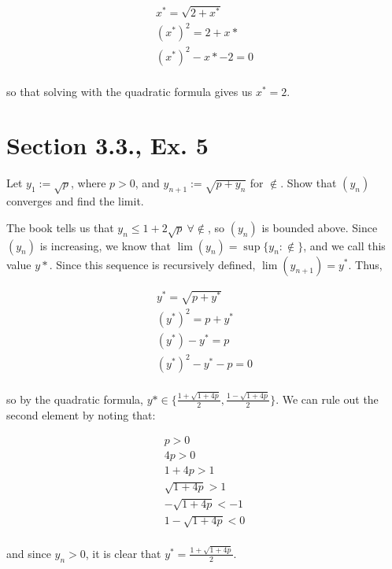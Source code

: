 \documentclass[paper=a4, fontsize=11pt]{scrartcl} %
\numberwithin{equation}{section} %
\numberwithin{figure}{section} %
\numberwithin{table}{section} %
\begin{document}
\begin{gather*}
x^* = \sqrt{2 + x^*}\\
(x^*)^2 = 2 + x*\\
(x^*)^2 - x* - 2 = 0\\
\end{gather*}

so that solving with the quadratic formula gives us $x^* = 2$. \done

\section*{Section 3.3., Ex. 5}

Let $y_1 := \sqrt{p}$, where $p > 0$, and $y_{n+1} := \sqrt{ p + y_n}$ for $\nin$. Show that $(y_n)$ converges and find the limit.

\newcommand{\fanin}{\forall \nin}
\pf The book tells us that $y_n \leq 1 + 2\sqrt{p} ~\fanin$, so $(y_n)$ is bounded above. Since $(y_n)$ is increasing, we know that $\lim(y_n) = \sup\{y_n : \nin\}$, and we call this value $y*$. Since this sequence is recursively defined, $\lim(y_{n+1}) = y^*$. Thus,

\begin{gather*}
y^* = \sqrt{p + y^*}\\
(y^*)^2 = p + y^*\\
(y^*) - y^* = p\\
(y^*)^2 - y^* - p = 0\\
\end{gather*}

so by the quadratic formula, $y* \in \{\frac{1 + \sqrt{1 + 4p}}{2}, \frac{1 - \sqrt{1 + 4p}}{2}\}$. We can rule out the second element by noting that:

\begin{gather*}
p > 0\\
4p > 0\\
1 + 4p > 1\\
\sqrt{1 + 4p} > 1\\
-\sqrt{1 + 4p} < -1\\
1 - \sqrt{1 + 4p} < 0\\
\end{gather*}

and since $y_n > 0$, it is clear that $y^* = \frac{1 + \sqrt{1 + 4p}}{2}$.\done
\end{document}
